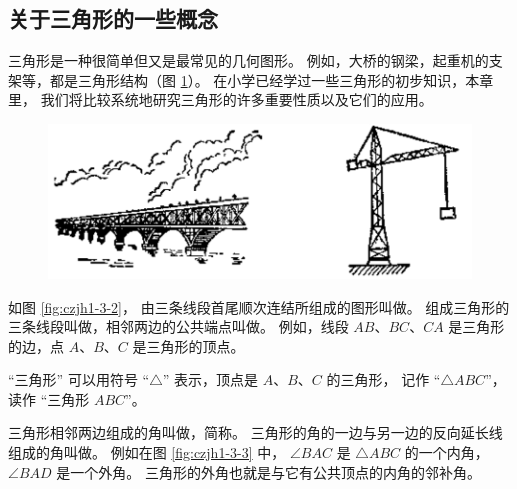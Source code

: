 \subsection{关于三角形的一些概念}\label{subsec:czjh1-3-1}

三角形是一种很简单但又是最常见的几何图形。
例如，大桥的钢梁，起重机的支架等，都是三角形结构（图 \ref{fig:czjh1-3-1}）。
在小学已经学过一些三角形的初步知识，本章里，
我们将比较系统地研究三角形的许多重要性质以及它们的应用。

\begin{figure}[htbp]
    \centering
    \includegraphics[width=12cm]{../pic/czjh1-ch3-01.png}
    \caption{}\label{fig:czjh1-3-1}
\end{figure}

如图 \ref{fig:czjh1-3-2}， 由三条线段首尾顺次连结所组成的图形叫做。
组成三角形的三条线段叫做，相邻两边的公共端点叫做。
例如，线段 $AB$、$BC$、$CA$ 是三角形的边，点 $A$、$B$、$C$ 是三角形的顶点。

\begin{figure}[htbp]
    \centering
    \begin{minipage}[b]{5cm}
        \centering
        
        \caption{}\label{fig:czjh1-3-2}
    \end{minipage}
    \qquad
    \begin{minipage}[b]{4.5cm}
        \centering
        
        \caption{}\label{fig:czjh1-3-3}
    \end{minipage}
    \qquad
    \begin{minipage}[b]{4.5cm}
        \centering
        
        \caption{}\label{fig:czjh1-3-4}
    \end{minipage}
\end{figure}

“三角形” 可以用符号 “$\triangle$” 表示，顶点是 $A$、$B$、$C$ 的三角形，
记作 “$\triangle ABC$”， 读作 “三角形 $ABC$”。

三角形相邻两边组成的角叫做，简称。
三角形的角的一边与另一边的反向延长线组成的角叫做。
例如在图 \ref{fig:czjh1-3-3} 中， $\angle BAC$ 是 $\triangle ABC$ 的一个内角，$\angle BAD$ 是一个外角。
三角形的外角也就是与它有公共顶点的内角的邻补角。

